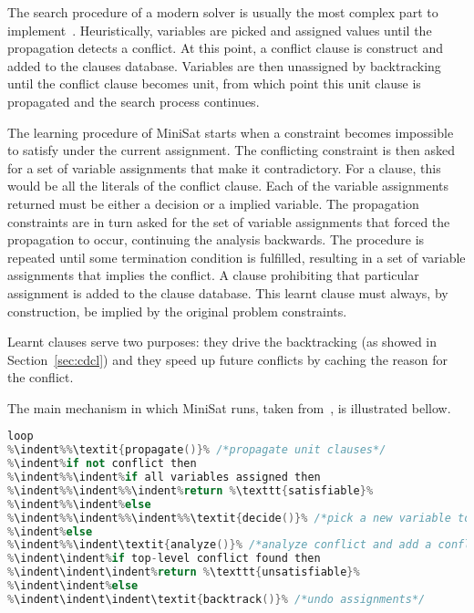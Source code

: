 The search procedure of a modern solver is usually the most complex part to
implement~\cite{een2003extensible}. Heuristically, variables are picked and
assigned values until the propagation detects a conflict. At this point, a
conflict clause is construct and added to the clauses database. Variables are
then unassigned by backtracking until the conflict clause becomes unit, from
which point this unit clause is propagated and the search process continues.

The learning procedure of MiniSat starts when a constraint becomes impossible to
satisfy under the current assignment. The conflicting constraint is then asked
for a set of variable assignments that make it contradictory. For a clause, this
would be all the literals of the conflict clause. Each of the variable
assignments returned must be either a decision or a implied variable. The
propagation constraints are in turn asked for the set of variable assignments
that forced the propagation to occur, continuing the analysis backwards. The
procedure is repeated until some termination condition is fulfilled, resulting
in a set of variable assignments that implies the conflict. A clause prohibiting
that particular assignment is added to the clause database. This learnt clause
must always, by construction, be implied by the original problem constraints.

Learnt clauses serve two purposes: they drive the backtracking (as showed in
Section~\ref{sec:cdcl}) and they speed up future conflicts by caching the reason
for the conflict. 

The main mechanism in which MiniSat runs, taken from~\cite{een2003extensible},
is illustrated bellow.

\begin{lstlisting}[frame=single, language=C++,morekeywords={var,loop,then,lit},escapechar=\%,
commentstyle=\color{gray},deletekeywords={not}]
loop
%\indent%%\textit{propagate()}% /*propagate unit clauses*/
%\indent%if not conflict then
%\indent%%\indent%if all variables assigned then
%\indent%%\indent%%\indent%return %\texttt{satisfiable}%
%\indent%%\indent%else
%\indent%%\indent%%\indent%%\textit{decide()}% /*pick a new variable to assign a value*/ 
%\indent%else
%\indent%%\indent\textit{analyze()}% /*analyze conflict and add a conflict clause*/
%\indent\indent%if top-level conflict found then
%\indent\indent\indent%return %\texttt{unsatisfiable}%
%\indent\indent%else
%\indent\indent\indent\textit{backtrack()}% /*undo assignments*/
\end{lstlisting}

